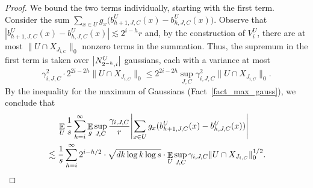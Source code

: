 \documentclass[11pt,letterpaper]{article}
\theoremstyle{definition}
\DeclareMathOperator*{\E}{\ensuremath{\mathbb{E}}}
\DeclarePairedDelimiter{\abs}{\lvert}{\rvert}
\begin{document}
\begin{proof}
\sloppy
We bound the two terms individually, starting with the first term. Consider the sum $\sum_{x\in U} g_x \big(b_{h+1,J,C}^U(x)-b_{h,J,C}^U(x)\big)$. 
Observe that $|b_{h+1,J,C}^U(x)-b_{h,J,C}^U(x)|\lesssim 2^{i-h} r$ and, by the construction of $V_i^U$, there are at most $\|U\cap X_{J_{i,C}} \|_0$ nonzero terms in the summation. Thus, the supremum in the first term is taken over $\abs[\big]{N^U_{2^{-h},i}}$ gaussians, each with a variance at most 
\[
    \gamma_{i,J,C}^2 \cdot 2^{2i-2h}\|U\cap X_{J_{i,C}}\|_0 
    \leq 2^{2i-2h} \sup_{J,C} \gamma_{i,J,C}^2 \|U\cap X_{J_{i,C}}\|_0.
\]
By the inequality for the maximum of Gaussians (Fact~\ref{fact_max_gauss}), we conclude that 
\begin{equation}\label{eqn:chaining_error_first_term_aux}
\begin{aligned}
&\quad\ \E_U \frac{1}{s} \sum_{h=i}^\infty \E_g \sup_{J,C} \frac{\gamma_{i,J,C}}{r} \abs*{\sum_{x\in U} g_x (b_{h+1,J,C}^U(x)-b_{h,J,C}^U(x))}   \\
&\lesssim  \frac{1}{s}\sum_{h=i}^{\infty} 2^{i-h/2} \cdot \sqrt{dk\log k \log s}\cdot \E_U \sup_{J,C} \gamma_{i,J,C}\|U\cap X_{J_{i,C}}\|_0^{1/2}.
\end{aligned}
\end{equation}



\end{proof}
\end{document}
